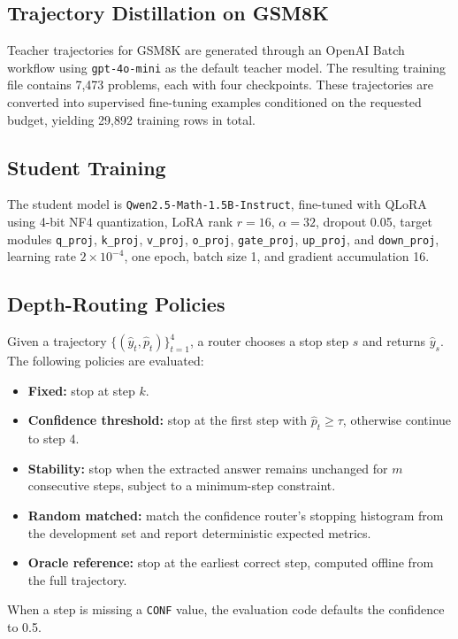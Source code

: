 \documentclass[conference]{IEEEtran}
\begin{document}
\subsection{Trajectory Distillation on GSM8K}
Teacher trajectories for GSM8K are generated through an OpenAI Batch workflow using \texttt{gpt-4o-mini} as the default teacher model. The resulting training file contains 7,473 problems, each with four checkpoints. These trajectories are converted into supervised fine-tuning examples conditioned on the requested budget, yielding 29,892 training rows in total.

\subsection{Student Training}
The student model is \texttt{Qwen2.5-Math-1.5B-Instruct}, fine-tuned with QLoRA using 4-bit NF4 quantization, LoRA rank $r{=}16$, $\alpha{=}32$, dropout 0.05, target modules \texttt{q\_proj}, \texttt{k\_proj}, \texttt{v\_proj}, \texttt{o\_proj}, \texttt{gate\_proj}, \texttt{up\_proj}, and \texttt{down\_proj}, learning rate $2\times 10^{-4}$, one epoch, batch size 1, and gradient accumulation 16.

\subsection{Depth-Routing Policies}
Given a trajectory $\{(\hat{y}_t, \hat{p}_t)\}_{t=1}^4$, a router chooses a stop step $s$ and returns $\hat{y}_s$. The following policies are evaluated:
\begin{itemize}
  \item \textbf{Fixed:} stop at step $k$.
  \item \textbf{Confidence threshold:} stop at the first step with $\hat{p}_t \ge \tau$, otherwise continue to step 4.
  \item \textbf{Stability:} stop when the extracted answer remains unchanged for $m$ consecutive steps, subject to a minimum-step constraint.
  \item \textbf{Random matched:} match the confidence router's stopping histogram from the development set and report deterministic expected metrics.
  \item \textbf{Oracle reference:} stop at the earliest correct step, computed offline from the full trajectory.
\end{itemize}
When a step is missing a \texttt{CONF} value, the evaluation code defaults the confidence to 0.5.
\end{document}
